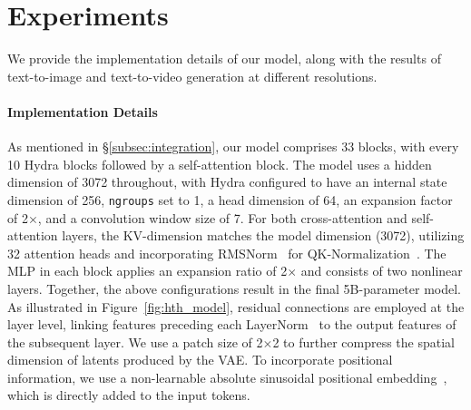 \section{Experiments}
\label{sec:experiments}

We provide the implementation details of our model, along with the results of text-to-image and text-to-video generation at different resolutions.

\paragraph{Implementation Details} 
As mentioned in \S\ref{subsec:integration}, our \ours{} model comprises 33 blocks, with every 10 Hydra blocks followed by a self-attention block. The model uses a hidden dimension of 3072 throughout, with Hydra configured to have an internal state dimension of 256, \texttt{ngroups} set to 1, a head dimension of 64, an expansion factor of 2$\times$, and a convolution window size of 7. For both cross-attention and self-attention layers, the KV-dimension matches the model dimension (3072), utilizing 32 attention heads and incorporating RMSNorm~\citep{zhang2019rmsnorm} for QK-Normalization~\citep{henry2020qknorm}. The MLP in each block applies an expansion ratio of 2$\times$ and consists of two nonlinear layers. Together, the above configurations result in the final 5B-parameter \ours{} model.
As illustrated in Figure~\ref{fig:hth_model}, residual connections are employed at the layer level, linking features preceding each LayerNorm~\citep{lei2016layernorm} to the output features of the subsequent layer.
We use a patch size of 2$\times$2 to further compress the spatial dimension of latents produced by the VAE. To incorporate positional information, we use a non-learnable absolute sinusoidal positional embedding~\citep{vaswani2017attention}, which is directly added to the input tokens.

